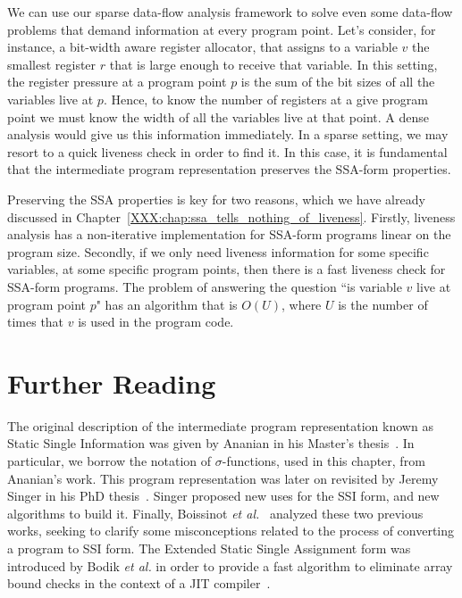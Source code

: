 We can use our sparse data-flow analysis framework to solve even some data-flow problems that demand information at every program point.
Let's consider, for instance, a bit-width aware register allocator, that assigns to a variable $v$ the smallest register $r$ that is large enough to receive that variable.
In this setting, the register pressure at a program point $p$ is the sum of the bit sizes of all the variables live at $p$.
Hence, to know the number of registers at a give program point we must know the width of all the variables live at that point.
A dense analysis would give us this information immediately.
In a sparse setting, we may resort to a quick liveness check in order to find it.
In this case, it is fundamental that the intermediate program representation preserves the SSA-form properties.

Preserving the SSA properties is key for two reasons, which we have already discussed in Chapter~\ref{XXX:chap:ssa_tells_nothing_of_liveness}.
Firstly, liveness analysis has a non-iterative implementation for SSA-form programs linear on the program size.
Secondly, if we only need liveness information for some specific variables, at some specific program points, then there is a fast liveness check for
SSA-form programs.
The problem of answering the question ``is variable $v$ live at program point $p$" has an algorithm that is $O(U)$, where $U$ is the number of times that $v$ is used in the program code.

\section{Further Reading}

The original description of the intermediate program representation known as Static Single Information was given by Ananian in his Master's thesis~\cite{Ananian99}.
In particular, we borrow the notation of $\sigma$-functions, used in this chapter, from Ananian's work.
This program representation was later on revisited by Jeremy Singer in his PhD thesis~\cite{Singer06}.
Singer proposed new uses for the SSI form, and new algorithms to build it.
Finally, Boissinot {\em et al.}~\cite{Benoit09} analyzed these two previous works, seeking to clarify some misconceptions related to the process of converting a program to SSI form.
The Extended Static Single Assignment form was introduced by Bodik {\em et al.} in order to provide a fast algorithm to eliminate array bound checks in the context of a JIT compiler~\cite{Bodik00}.

